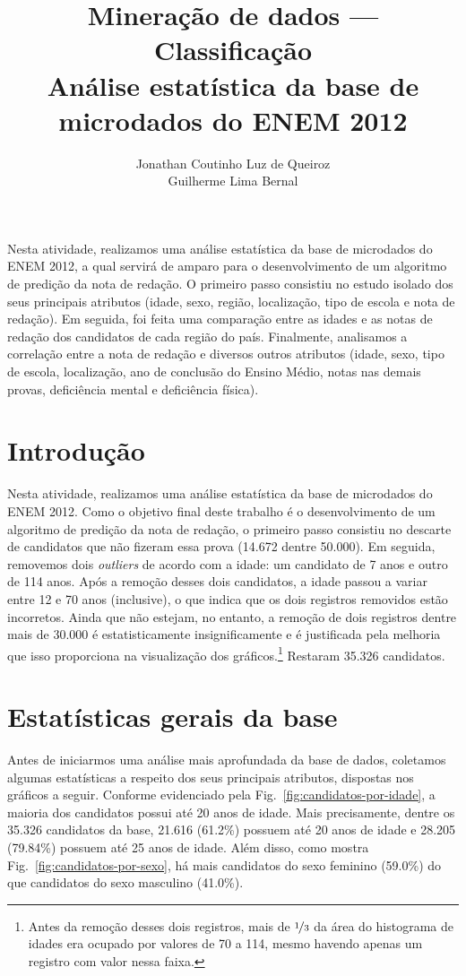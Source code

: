\documentclass[12pt]{article}
\title{Mineração de dados --- Classificação \\ Análise estatística da base de microdados do ENEM 2012}
\author{Jonathan Coutinho Luz de Queiroz\inst{1} \\ Guilherme Lima Bernal\inst{1}}
\newcommand{\reffig}[1]{Fig.~\ref{fig:#1}}
\begin{document}
 

\maketitle

\begin{resumo}
Nesta atividade, realizamos uma análise estatística da base de microdados do ENEM 2012, a qual servirá de amparo para o desenvolvimento de um algoritmo de predição da nota de redação.
O primeiro passo consistiu no estudo isolado dos seus principais atributos (idade, sexo, região, localização, tipo de escola e nota de redação).
Em seguida, foi feita uma comparação entre as idades e as notas de redação dos candidatos de cada região do país.
Finalmente, analisamos a correlação entre a nota de redação e diversos outros atributos (idade, sexo, tipo de escola, localização, ano de conclusão do Ensino Médio, notas nas demais provas, deficiência mental e deficiência física).
\end{resumo}

\section{Introdução}
Nesta atividade, realizamos uma análise estatística da base de microdados do ENEM 2012.
Como o objetivo final deste trabalho é o desenvolvimento de um algoritmo de predição da nota de redação, o primeiro passo consistiu no descarte de candidatos que não fizeram essa prova (14.672 dentre 50.000).
Em seguida, removemos dois \emph{outliers} de acordo com a idade: um candidato de 7 anos e outro de 114 anos.
Após a remoção desses dois candidatos, a idade passou a variar entre 12 e 70 anos (inclusive), o que indica que os dois registros removidos estão incorretos.
Ainda que não estejam, no entanto, a remoção de dois registros dentre mais de 30.000 é estatisticamente insignificamente e é justificada pela melhoria que isso proporciona na visualização dos gráficos.\footnote{Antes da remoção desses dois registros, mais de $\nicefrac{1}{3}$ da área do histograma de idades era ocupado por valores de 70 a 114, mesmo havendo apenas um registro com valor nessa faixa.}
Restaram 35.326 candidatos.

\section{Estatísticas gerais da base}
\label{sec:estatisticas-gerais}
Antes de iniciarmos uma análise mais aprofundada da base de dados, coletamos algumas estatísticas a respeito dos seus principais atributos, dispostas nos gráficos a seguir.
Conforme evidenciado pela \reffig{candidatos-por-idade}, a maioria dos candidatos possui até 20 anos de idade.
Mais precisamente, dentre os 35.326 candidatos da base, 21.616 (61.2\%) possuem até 20 anos de idade e 28.205 (79.84\%) possuem até 25 anos de idade.
Além disso, como mostra \reffig{candidatos-por-sexo}, há mais candidatos do sexo feminino (59.0\%) do que candidatos do sexo masculino (41.0\%).
\end{document}
